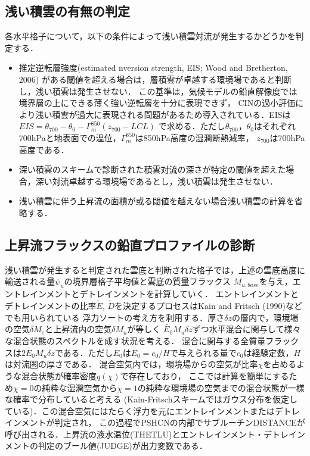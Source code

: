 \documentclass[platex, dvipdfmx]{jsarticle}
\begin{document}
\subsection{浅い積雲の有無の判定}
 各水平格子について，以下の条件によって浅い積雲対流が発生するかどうかを判定する．
 \begin{itemize}
    \item 推定逆転層強度(estimated nversion strength, EIS; Wood and Bretherton, 2006) がある閾値を超える場合は，層積雲が卓越する環境場であると判断し，浅い積雲は発生させない．
     この基準は，気候モデルの鉛直解像度では境界層の上にできる薄く強い逆転層を十分に表現できず，
     CINの過小評価により浅い積雲が過大に表現される問題があるため導入されている．EISは
     $EIS=\theta_{700}-\theta_{0}-\Gamma_m^{850}(z_{700}-LCL)$
    で求める．ただし$\theta_{700}$，$\theta_0$はそれぞれ700hPaと地表面での温位，$\Gamma_m^{850}$は850hPa高度の湿潤断熱減率，
    $z_{700}$は700hPa高度である．
   \item 深い積雲のスキームで診断された積雲対流の深さが特定の閾値を超えた場合，深い対流卓越する環境場であるとし，浅い積雲は発生させない．
   \item 浅い積雲に伴う上昇流の面積が或る閾値を越えない場合浅い積雲の計算を省略する． 
 \end{itemize}

\subsection{上昇流フラックスの鉛直プロファイルの診断}
浅い積雲が発生すると判定された雲底と判断された格子では，上述の雲底高度に輸送される量$\psi_u$の境界層格子平均値と雲底の質量フラックス
$M_{u,base}$を与え，エントレインメントとデトレインメントを計算していく．
エントレインメントとデトレインメントの比率$\tilde{E}$, $\tilde{D}$を決定するプロセスはKain and Fritsch (1990)などでも用いられている
浮力ソートの考え方を利用する．厚さ$\delta z$の層内で，環境場の空気$\delta M_e$と上昇流内の空気$\delta M_u$が等しく
$\tilde{E_0} M_u \delta z$ずつ水平混合に関与して様々な混合状態のスペクトルを成す状況を考える．
混合に関与する全質量フラックスは$2\tilde{E_0} M_u\delta z$である．ただし$\tilde{E_0}$は$\tilde{E_0}=c_0/H$で与えられる量で$c_0$は経験定数，$H$は対流圏の厚さである．
混合空気内では，環境場からの空気が比率$\chi$を占めるような混合状態が確率密度$q(\chi)$で存在しており，
ここでは計算を簡単にするため$\chi=0$の純粋な湿潤空気から$\chi=1$の純粋な環境場の空気までの混合状態が一様な確率で分布していると考える
(Kain-Fritschスキームではガウス分布を仮定している)．この混合空気にはたらく浮力を元にエントレインメントまたはデトレインメントが判定され，
この過程でPSHCNの内部でサブルーチンDISTANCEが呼び出される．上昇流の液水温位(THETLU)とエントレインメント・デトレインメントの判定のブール値(JUDGE)が出力変数である．
\end{document}
